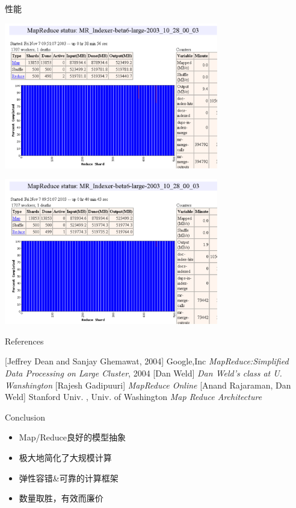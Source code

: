 \documentclass{beamer}
\begin{document}
\begin{frame}{性能}
\begin{overprint}
    \centerline{\includegraphics[height=180pt]{keyan/p9.png} }
    \centerline{\includegraphics[height=180pt]{keyan/p10.png} }
\end{overprint}
\end{frame}




\begin{frame}{References}

\begin{thebibliography}{10}
 [Jeffrey Dean and Sanjay Ghemawat, 2004]
    \newblock Google,Inc
    \newblock \emph{MapReduce:Simplified Data Processing on Large Cluster}, 2004
 [Dan Weld]
    \newblock \emph{Dan Weld's class at U. Wanshington}
 [Rajesh Gadipuuri]
    \newblock \emph{MapReduce Online}
[Anand Rajaraman, Dan Weld]
    \newblock Stanford Univ. , Univ. of Washington
    \newblock \emph{Map Reduce Architecture}
\end{thebibliography}
\end{frame}

\begin{frame}{Conclusion}
\begin{itemize}
    \item Map/Reduce良好的模型抽象
    \item 极大地简化了大规模计算
    \item 弹性容错\&可靠的计算框架
    \item 数量取胜，有效而廉价
\end{itemize}
\end{frame}
\end{document}
